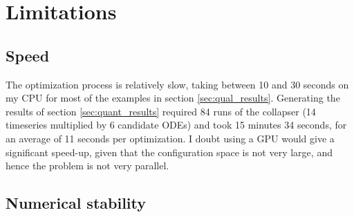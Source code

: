 \documentclass{article}
\begin{document}
\section{Limitations}

\subsection{Speed}

The optimization process is relatively slow, taking between 10 and 30 seconds on my CPU for most of the examples in section \ref{sec:qual_results}.
Generating the results of section \ref{sec:quant_results} required 84 runs of the collapser (14 timeseries multiplied by 6 candidate ODEs) and took 15 minutes 34 seconds, for an average of 11 seconds per optimization.
I doubt using a GPU would give a significant speed-up, given that the configuration space is not very large, and hence the problem is not very parallel.



\subsection{Numerical stability}
\label{sec:numerical_stability}



\end{document}
